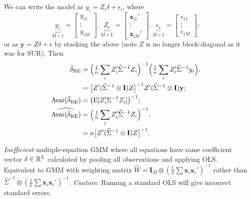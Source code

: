 \documentclass[8pt,letterpaper, landscape]{extarticle} %
\newcommand{\mx}{\ensuremath{\mathbf{x}}}
\newcommand{\mI}{\ensuremath{\mathbf{I}}}
\begin{document}
\begin{multicols}{3}
\begin{description}
We can write the model as $ y_i = Z_i \delta + \epsilon_i $, where
$$
\underbrace{y_i}_{M \times 1} = \begin{bmatrix} y_{i1} \\ \vdots \\ y_{iM} \end{bmatrix},
\underbrace{Z_i}_{M \times L} = \begin{bmatrix} \mathbf{z}_{i1}' \\ \vdots \\ \mathbf{z}_{iM}' \end{bmatrix},
\underbrace{\epsilon_i}_{M \times 1} = \begin{bmatrix} \epsilon_{i1} \\ \vdots \\ \epsilon_{iM} \end{bmatrix};
$$
or as $ \mathbf{y} = Z \delta + \epsilon $ by stacking the above (note $ Z $ is no longer block-diagonal as it was for SUR). Then
\begin{align*}
\hat{\delta}_{\text{RE}} &= \Bigl ( \tfrac{1}{n} \sum_{i} Z_{i}' \widehat{\Sigma}^{-1} Z_i \Bigr )^{-1} \Bigl ( \tfrac{1}{n} \sum_{i} Z_{i}' \widehat{\Sigma}^{-1} y_i \Bigr ) , \\
&= \bigl [ Z' (\widehat{\Sigma}^{-1} \otimes \mI) Z \bigr ]^{-1} Z' (\widehat{\Sigma}^{-1} \otimes \mI) \mathbf{y} ; \\
\Avar(\hat{\delta}_{\text{RE}}) &= \bigl ( \E [Z_{i}' \Sigma^{-1} Z_i]  \bigr )^{-1}; \\
\widehat{\Avar(\hat{\delta}_{\text{RE}})} &= \Bigl ( \tfrac{1}{n} \sum_{i} Z_{i}' \widehat{\Sigma}^{-1} Z_i \Bigr )^{-1} ,\\
&= n \bigl [ Z' (\widehat{\Sigma}^{-1} \otimes \mI) Z \bigr ]^{-1} .
\end{align*}

 \textit{Inefficient} multiple-equation GMM where all equations have same coefficient vector $ \delta \in \mathbb{R}^L $ calculated by pooling all observations and applying OLS. Equivalent to GMM with weighting matrix $ \widehat{W} = \mI_{M} \otimes ( \tfrac{1}{n} \sum \mx_i \mx_{i}' )^{-1} $ rather than $ \widehat{\Sigma}^{-1} \otimes ( \tfrac{1}{n} \sum \mx_i \mx_{i}' )^{-1} $. \textit{Caution:} Running a standard OLS will give incorrect standard errors.


\end{description}
\end{multicols}
\end{document}
